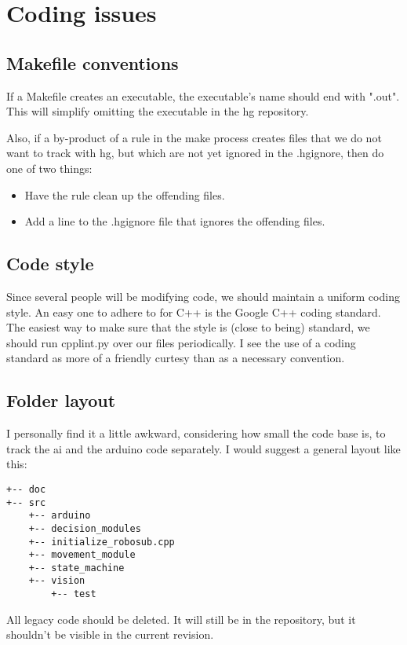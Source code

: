 \documentclass[11pt]{scrartcl}
\begin{document}
  \section{Coding issues}
    \subsection{Makefile conventions}
      If a Makefile creates an executable, the executable's name should end with ".out". This will simplify omitting the executable in the hg repository.

      Also, if a by-product of a rule in the make process creates files that we do not want to track with hg, but which are not yet ignored in the .hgignore, then do one of two things:

      \begin{itemize}
        \item Have the rule clean up the offending files.
        \item Add a line to the .hgignore file that ignores the offending files.
      \end{itemize}

    \subsection{Code style}
      Since several people will be modifying code, we should maintain a uniform coding style. An easy one to adhere to for C++ is the Google C++ coding standard. The easiest way to make sure that the style is (close to being) standard, we should run cpplint.py over our files periodically. I see the use of a coding standard as more of a friendly curtesy than as a necessary convention.

    \subsection{Folder layout}
      I personally find it a little awkward, considering how small the code base is, to track the ai and the arduino code separately. I would suggest a general layout like this:

      \begin{verbatim}
+-- doc
+-- src
    +-- arduino
    +-- decision_modules
    +-- initialize_robosub.cpp
    +-- movement_module
    +-- state_machine
    +-- vision
        +-- test
      \end{verbatim}
      All legacy code should be deleted. It will still be in the repository, but it shouldn't be visible in the current revision.
\end{document}
